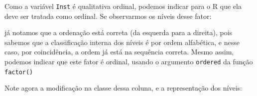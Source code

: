 \documentclass[
  10pt,
  a4paper]{book}
\newenvironment{Shaded}{\begin{snugshade}}{\end{snugshade}}
\newcommand{\AttributeTok}[1]{\textcolor[rgb]{0.77,0.63,0.00}{#1}}
\newcommand{\ConstantTok}[1]{\textcolor[rgb]{0.00,0.00,0.00}{#1}}
\newcommand{\DecValTok}[1]{\textcolor[rgb]{0.00,0.00,0.81}{#1}}
\newcommand{\FunctionTok}[1]{\textcolor[rgb]{0.00,0.00,0.00}{#1}}
\newcommand{\NormalTok}[1]{#1}
\newcommand{\OtherTok}[1]{\textcolor[rgb]{0.56,0.35,0.01}{#1}}
\newcommand{\SpecialCharTok}[1]{\textcolor[rgb]{0.00,0.00,0.00}{#1}}
\newcommand{\StringTok}[1]{\textcolor[rgb]{0.31,0.60,0.02}{#1}}
\begin{document}
Como a variável \texttt{Inst} é qualitativa ordinal, podemos indicar para o R
que ela deve ser tratada como ordinal. Se observarmos os níveis desse
fator:

\begin{Shaded}
\end{Shaded}

já notamos que a ordenação está correta (da esquerda para a direita),
pois sabemos que a classificação interna dos níveis é por ordem
alfabética, e nesse caso, por coincidência, a ordem já está na sequência
correta. Mesmo assim, podemos indicar que este fator é ordinal, usando o
argumento \texttt{ordered} da função \texttt{factor()}

\begin{Shaded}
\end{Shaded}

Note agora a modificação na classe dessa coluna, e a representação dos
níveis:

\begin{Shaded}
\end{Shaded}
\end{document}
